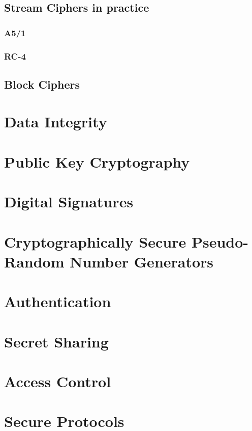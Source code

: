 	\subsection{Stream Ciphers in practice}
	\subsubsection{A5/1}
	\subsubsection{RC-4}
	
	\newpage
	\subsection{Block Ciphers}
	
	\newpage
	\section{Data Integrity}
	
	\newpage
	\section{Public Key Cryptography}
	
	\newpage
	\section{Digital Signatures}
	
	\newpage
	\section{Cryptographically Secure Pseudo-Random Number Generators}
	
	\newpage
	\section{Authentication}

	\newpage
	\section{Secret Sharing}

	\newpage
	\section{Access Control}

	\newpage
	\section{Secure Protocols}
	
